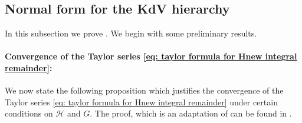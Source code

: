\documentclass[a4paper,10pt,reqno]{article}
\theoremstyle{definition}
\theoremstyle{plain}
\theoremstyle{plain}
\theoremstyle{definition}
\theoremstyle{plain}
\theoremstyle{plain}
\theoremstyle{plain}
\theoremstyle{definition}
\theoremstyle{definition}
\def \H{\mathcal{H}}
\begin{document}
\subsection{Normal form for the KdV hierarchy} \label{subsection: proof of thm}

In this subsection we prove . We begin with some preliminary results. 

\paragraph{Convergence of the Taylor series \eqref{eq: taylor formula for Hnew integral remainder}:}
We now state the following proposition which justifies the convergence of the Taylor series \eqref{eq: taylor formula for Hnew integral remainder} under certain conditions on $\H$ and $G$.
The proof, which is an adaptation of \cite[Proposition 3.10]{bernier} can be found in .
\end{document}
